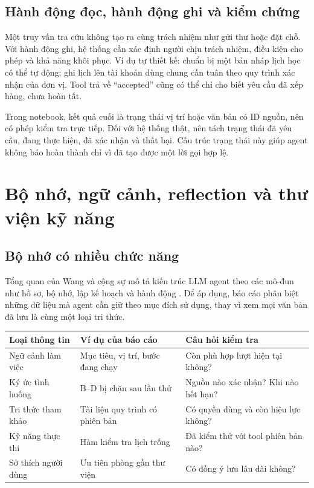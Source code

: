 \subsection{Hành động đọc, hành động ghi và kiểm chứng}
Một truy vấn tra cứu không tạo ra cùng trách nhiệm như gửi thư hoặc đặt chỗ. Với hành
động ghi, hệ thống cần xác định người chịu trách nhiệm, điều kiện cho phép và khả năng
khôi phục. Ví dụ tự thiết kế: chuẩn bị một bản nháp lịch học có thể tự động; ghi lịch
lên tài khoản dùng chung cần tuân theo quy trình xác nhận của đơn vị. Tool trả về
``accepted'' cũng có thể chỉ cho biết yêu cầu đã xếp hàng, chưa hoàn tất.

Trong notebook, kết quả cuối là trạng thái vị trí hoặc văn bản có ID nguồn, nên có
phép kiểm tra trực tiếp. Đối với hệ thống thật, nên tách trạng thái đã yêu cầu, đang
thực hiện, đã xác nhận và thất bại. Cấu trúc trạng thái này giúp agent không báo hoàn
thành chỉ vì đã tạo được một lời gọi hợp lệ.

\newpage
\section{Bộ nhớ, ngữ cảnh, reflection và thư viện kỹ năng}
\subsection{Bộ nhớ có nhiều chức năng}
Tổng quan của Wang và cộng sự mô tả kiến trúc LLM agent theo các mô-đun như hồ sơ,
bộ nhớ, lập kế hoạch và hành động \cite{llmsurvey}. Để áp dụng, báo cáo phân biệt
những dữ liệu mà agent cần giữ theo mục đích sử dụng, thay vì xem mọi văn bản đã lưu
là cùng một loại tri thức.

\begin{center}\small
\begin{tabularx}{\linewidth}{@{}p{2.7cm}XX@{}}\toprule
\textbf{Loại thông tin} & \textbf{Ví dụ của báo cáo} & \textbf{Câu hỏi kiểm tra}\\\midrule
Ngữ cảnh làm việc & Mục tiêu, vị trí, bước đang chạy & Còn phù hợp lượt hiện tại không?\\
Ký ức tình huống & B--D bị chặn sau lần thử & Nguồn nào xác nhận? Khi nào hết hạn?\\
Tri thức tham khảo & Tài liệu quy trình có phiên bản & Có quyền dùng và còn hiệu lực không?\\
Kỹ năng thực thi & Hàm kiểm tra lịch trống & Đã kiểm thử với tool phiên bản nào?\\
Sở thích người dùng & Ưu tiên phòng gần thư viện & Có đồng ý lưu lâu dài không?\\\bottomrule
\end{tabularx}\end{center}


